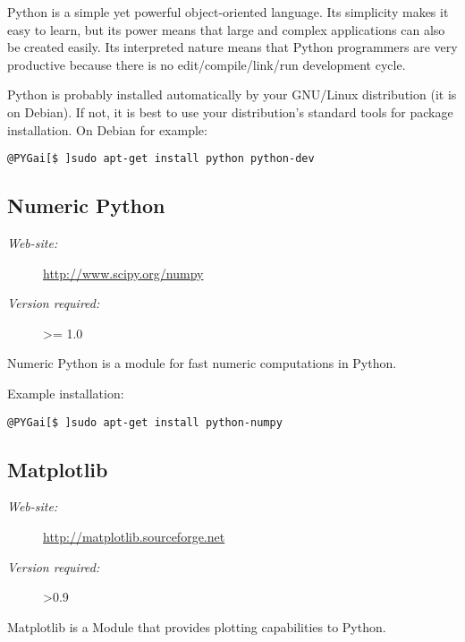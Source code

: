 \documentclass[a4paper,10pt]{manual}
\begin{document}
Python is a simple yet powerful object-oriented language. Its simplicity makes it easy to learn, but its power means that large and complex applications can also be created easily. Its interpreted nature means that Python programmers are very productive because there is no edit/compile/link/run development cycle.

Python is probably installed automatically by your GNU/Linux distribution (it is on Debian). If not, it is best to use your distribution's standard tools for package installation. On Debian for example:

\begin{Verbatim}[commandchars=@\[\]]
@PYGai[$ ]sudo apt-get install python python-dev
\end{Verbatim}


\subsection{Numeric Python}
\begin{description}
\item[\emph{Web-site:}]
\href{http://www.scipy.org/numpy}{http://www.scipy.org/numpy}

\item[\emph{Version required:}]
\textgreater{}= 1.0

\end{description}

Numeric Python is a module for fast numeric computations in Python.

Example installation:

\begin{Verbatim}[commandchars=@\[\]]
@PYGai[$ ]sudo apt-get install python-numpy
\end{Verbatim}


\subsection{Matplotlib}
\begin{description}
\item[\emph{Web-site:}]
\href{http://matplotlib.sourceforge.net}{http://matplotlib.sourceforge.net}

\item[\emph{Version required:}]
\textgreater{}0.9

\end{description}

Matplotlib is a Module that provides plotting capabilities to Python.
\end{document}
